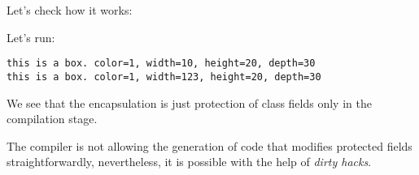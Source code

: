 

Let's check how it works:



Let's run:

\begin{lstlisting}
this is a box. color=1, width=10, height=20, depth=30
this is a box. color=1, width=123, height=20, depth=30
\end{lstlisting}

We see that the encapsulation is just protection of class fields only in the compilation stage.

The \Cpp compiler is not allowing the generation of code that modifies protected 
fields straightforwardly, nevertheless,
it is possible with the help of \emph{dirty hacks}.

